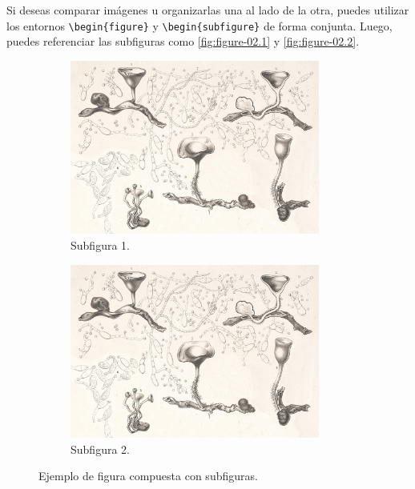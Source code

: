 Si deseas comparar imágenes u organizarlas una al lado de la otra, puedes utilizar los entornos \verb|\begin{figure}| y \verb|\begin{subfigure}| de forma conjunta. Luego, puedes referenciar las subfiguras como \autoref{fig:figure-02.1} y \autoref{fig:figure-02.2}.

\begin{figure}[!htpb]
    \centering
    \begin{subfigure}{0.45\textwidth}
        \centering
        \includegraphics[width=0.9\textwidth]{Figures/PezizaTuberosa.jpg}
        \caption{Subfigura 1.}
        \label{fig:figure-02.1}
    \end{subfigure}
    \hspace{.5cm}
    \begin{subfigure}{0.45\textwidth}
        \centering
        \includegraphics[width=0.9\textwidth]{Figures/PezizaTuberosa.jpg}
        \caption{Subfigura 2.}
        \label{fig:figure-02.2}
    \end{subfigure}
    \caption{Ejemplo de figura compuesta con subfiguras.}
    \label{fig:figure-02}
\end{figure}

